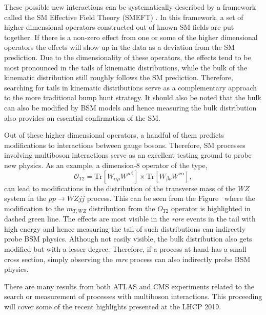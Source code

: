 \documentclass[10pt]{article}
\begin{document}
These possible new interactions can be systematically described by a framework called the SM Effective Field Theory (SMEFT) \cite{deBlas:2017xtg}.
In this framework, a set of higher dimensional operators constructed out of known SM fields are put together.
If there is a non-zero effect from one or some of the higher dimensional operators the effects will show up in the data as a deviation from the SM prediction.
Due to the dimensionality of these operators, the effects tend to be most pronounced in the tails of kinematic distributions, while the bulk of the kinematic distribution still roughly follows the SM prediction.
Therefore, searching for tails in kinematic distributions serve as a complementary approach to the more traditional bump hunt strategy.
It should also be noted that the bulk can also be modified by BSM models and hence measuring the bulk distribution also provides an essential confirmation of the SM.

Out of these higher dimensional operators, a handful of them predicts modifications to interactions between gauge bosons.
Therefore, SM processes involving multiboson interactions serve as an excellent testing ground to probe new physics.
As an example, a dimension-8 operator of the type,
\begin{equation}
    \mathcal{O}_{T2} = \textrm{Tr}\left[W_{\alpha\mu}W^{\mu\beta}\right]\times\textrm{Tr}\left[W_{\beta\nu}W^{\nu\alpha}\right],
\end{equation}
can lead to modifications in the distribution of the transverse mass of the $WZ$ system in the $pp\to WZjj$ process.
This can be seen from the Figure~ where the modification to the $m_{T,WZ}$ distribution from the $O_{T2}$ operator is highlighted in dashed green line.
The effects are most visible in the \emph{rare} events in the tail with high energy and hence measuring the tail of such distributions can indirectly probe BSM physics.
Although not easily visible, the bulk distribution also gets modified but with a lesser degree.
Therefore, if a process at hand has a small cross section, simply observing the \emph{rare} process can also indirectly probe BSM physics.

There are many results from both ATLAS and CMS experiments related to the search or measurement of processes with multiboson interactions.
This proceeding will cover some of the recent highlights presented at the LHCP 2019.
\end{document}
